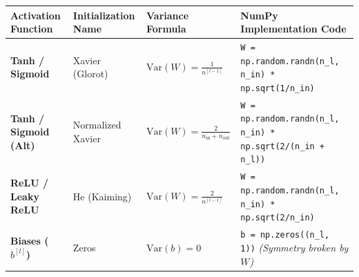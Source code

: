 \documentclass[10pt,a4paper]{article}
\begin{document}
\vspace{1pt}

\par\vspace{1pt}
\begin{center}
\footnotesize
\setlength{\tabcolsep}{4pt}
\begin{tabularx}{\textwidth}{p{}p{}p{}>{\raggedright\arraybackslash}X}
\toprule
\rowcolor{lightbg}
\textbf{Activation Function} & \textbf{Initialization Name} & \textbf{Variance Formula} & \textbf{NumPy Implementation Code} \\
\midrule
\textbf{Tanh / Sigmoid} & Xavier (Glorot) & $\text{Var}(W) = \frac{1}{n^{[l-1]}}$ & \texttt{W = np.random.randn(n\_l, n\_in) * np.sqrt(1/n\_in)} \\
\midrule
\textbf{Tanh / Sigmoid (Alt)} & Normalized Xavier & $\text{Var}(W) = \frac{2}{n_{\text{in}} + n_{\text{out}}}$ & \texttt{W = np.random.randn(n\_l, n\_in) * np.sqrt(2/(n\_in + n\_l))} \\
\midrule
\textbf{ReLU / Leaky ReLU} & He (Kaiming) & $\text{Var}(W) = \frac{2}{n^{[l-1]}}$ & \texttt{W = np.random.randn(n\_l, n\_in) * np.sqrt(2/n\_in)} \\
\midrule
\textbf{Biases ($b^{[l]}$)} & Zeros & $\text{Var}(b) = 0$ & \texttt{b = np.zeros((n\_l, 1))} \textit{(Symmetry broken by $W$)} \\
\bottomrule
\end{tabularx}
\end{center}
\end{document}
